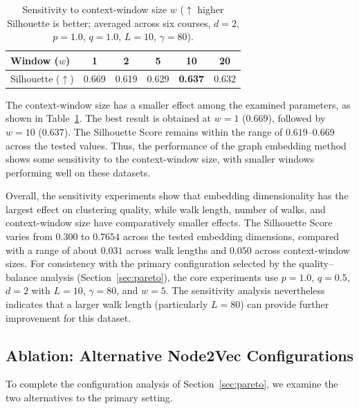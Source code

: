 \documentclass[pdflatex,sn-mathphys-num,iicol]{sn-jnl}%
\theoremstyle{thmstyleone}%
\theoremstyle{thmstyletwo}%
\theoremstyle{thmstylethree}%
\begin{document}
\begin{table}[t]
\centering
\caption{Sensitivity to context-window size $w$ ($\uparrow$ higher Silhouette is better; averaged across six courses, $d=2$, $p=1.0$, $q=1.0$, $L=10$, $\gamma=80$).}
\label{tab:sensitivity_window}
\begin{tabular}{lccccc}
\toprule
\textbf{Window ($w$)} & 1 & 2 & 5 & 10 & 20 \\
\midrule
Silhouette ($\uparrow$) & 0.669 & 0.619 & 0.629 & \textbf{0.637} & 0.632 \\
\bottomrule
\end{tabular}
\end{table}

The context-window size has a smaller effect among the examined parameters, as shown in Table~\ref{tab:sensitivity_window}. The best result is obtained at $w=1$ ($0.669$), followed by $w=10$ ($0.637$). The Silhouette Score remains within the range of $0.619$--$0.669$ across the tested values. Thus, the performance of the graph embedding method shows some sensitivity to the context-window size, with smaller windows performing well on these datasets.

Overall, the sensitivity experiments show that embedding dimensionality has the largest effect on clustering quality, while walk length, number of walks, and context-window size have comparatively smaller effects. The Silhouette Score varies from $0.300$ to $0.7654$ across the tested embedding dimensions, compared with a range of about $0.031$ across walk lengths and $0.050$ across context-window sizes. For consistency with the primary configuration selected by the quality--balance analysis (Section~\ref{sec:pareto}), the core experiments use $p=1.0$, $q=0.5$, $d=2$ with $L=10$, $\gamma=80$, and $w=5$. The sensitivity analysis nevertheless indicates that a larger walk length (particularly $L=80$) can provide further improvement for this dataset.

\subsection{Ablation: Alternative Node2Vec Configurations}
\label{sec:ablation}

To complete the configuration analysis of Section~\ref{sec:pareto}, we examine the two alternatives to the primary setting.
\end{document}
